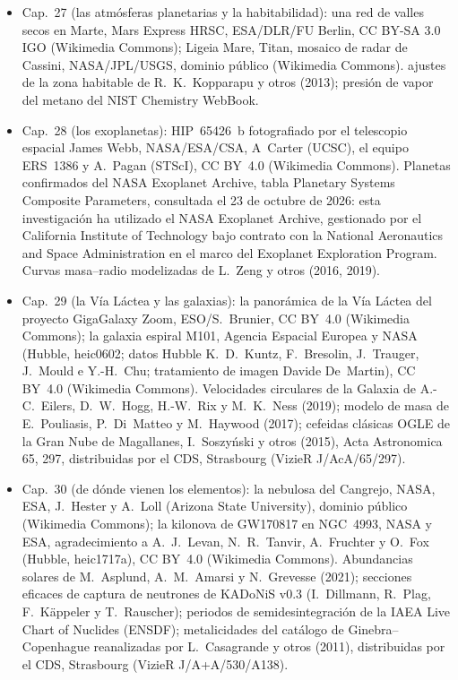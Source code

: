 \begin{itemize}
  \item Cap.~27 (las atmósferas planetarias y la habitabilidad): una red de valles secos en Marte, Mars Express HRSC, ESA/DLR/FU Berlin, CC BY-SA 3.0 IGO (Wikimedia Commons); Ligeia Mare, Titan, mosaico de radar de Cassini, NASA/JPL/USGS, dominio público (Wikimedia Commons). ajustes de la zona habitable de R.~K.~Kopparapu y otros (2013); presión de vapor del metano del NIST Chemistry WebBook.
  \item Cap.~28 (los exoplanetas): HIP~65426~b fotografiado por el telescopio espacial James Webb, NASA/ESA/CSA, A~Carter (UCSC), el equipo ERS~1386 y A.~Pagan (STScI), CC BY~4.0 (Wikimedia Commons). Planetas confirmados del NASA Exoplanet Archive, tabla Planetary Systems Composite Parameters, consultada el 23 de octubre de 2026: esta investigación ha utilizado el NASA Exoplanet Archive, gestionado por el California Institute of Technology bajo contrato con la National Aeronautics and Space Administration en el marco del Exoplanet Exploration Program. Curvas masa--radio modelizadas de L.~Zeng y otros (2016, 2019).
  \item Cap.~29 (la Vía Láctea y las galaxias): la panorámica de la Vía Láctea del proyecto GigaGalaxy Zoom, ESO/S.~Brunier, CC BY~4.0 (Wikimedia Commons); la galaxia espiral M101, Agencia Espacial Europea y NASA (Hubble, heic0602; datos Hubble K.~D.~Kuntz, F.~Bresolin, J.~Trauger, J.~Mould e Y.-H.~Chu; tratamiento de imagen Davide De~Martin), CC BY~4.0 (Wikimedia Commons). Velocidades circulares de la Galaxia de A.-C.~Eilers, D.~W.~Hogg, H.-W.~Rix y M.~K.~Ness (2019); modelo de masa de E.~Pouliasis, P.~Di~Matteo y M.~Haywood (2017); cefeidas clásicas OGLE de la Gran Nube de Magallanes, I.~Soszy\'nski y otros (2015), Acta Astronomica 65, 297, distribuidas por el CDS, Strasbourg (VizieR J/AcA/65/297).
  \item Cap.~30 (de dónde vienen los elementos): la nebulosa del Cangrejo, NASA, ESA, J.~Hester y A.~Loll (Arizona State University), dominio público (Wikimedia Commons); la kilonova de GW170817 en NGC~4993, NASA y ESA, agradecimiento a A.~J.~Levan, N.~R.~Tanvir, A.~Fruchter y O.~Fox (Hubble, heic1717a), CC BY~4.0 (Wikimedia Commons). Abundancias solares de M.~Asplund, A.~M.~Amarsi y N.~Grevesse (2021); secciones eficaces de captura de neutrones de KADoNiS v0.3 (I.~Dillmann, R.~Plag, F.~K\"appeler y T.~Rauscher); periodos de semidesintegración de la IAEA Live Chart of Nuclides (ENSDF); metalicidades del catálogo de Ginebra--Copenhague reanalizadas por L.~Casagrande y otros (2011), distribuidas por el CDS, Strasbourg (VizieR J/A+A/530/A138).
\end{itemize}
